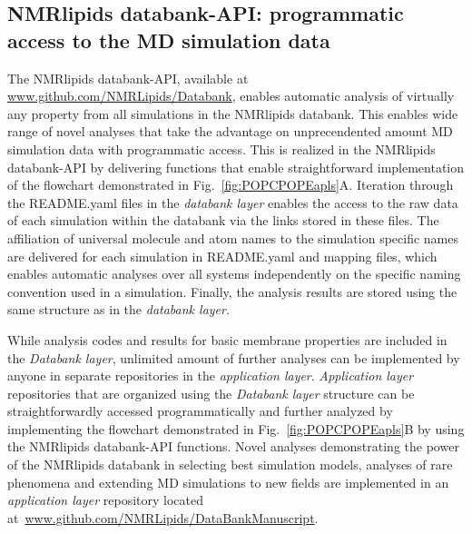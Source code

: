 \documentclass[fleqn,10pt]{wlscirep}
\begin{document}
\subsection{NMRlipids databank-API: programmatic access to the MD simulation data}
The NMRlipids databank-API, available at \url{www.github.com/NMRLipids/Databank}, enables automatic analysis of virtually any property from all simulations in the NMRlipids databank. This enables wide range of novel analyses that take the advantage on unprecendented amount MD simulation data with programmatic access. This is realized in the NMRlipids databank-API by delivering functions that enable straightforward implementation of the flowchart demonstrated in Fig.~\ref{fig:POPCPOPEapls}A. Iteration through the README.yaml files in the {\it databank layer} enables the access to the raw data of each simulation within the databank via the links stored in these files. The affiliation of universal molecule and atom names to the simulation specific names are delivered for each simulation in README.yaml and mapping files, which enables automatic analyses over all systems independently on the specific naming convention used in a simulation. Finally, the analysis results are stored using the same structure as in the {\it databank layer}. 

While analysis codes and results for basic membrane properties 
are included in the {\it Databank layer}, unlimited amount of further analyses can be implemented by anyone in separate repositories in the {\it application layer}. {\it Application layer} repositories that are organized using the {\it Databank layer} structure can be straightforwardly accessed programmatically and further analyzed by implementing the flowchart demonstrated in Fig.~\ref{fig:POPCPOPEapls}B by using the NMRlipids databank-API functions. Novel analyses demonstrating the power of the NMRlipids databank in selecting best simulation models, analyses of rare phenomena and extending MD simulations to new fields are implemented in an {\it application layer} repository located at~\url{www.github.com/NMRLipids/DataBankManuscript}.
\end{document}
